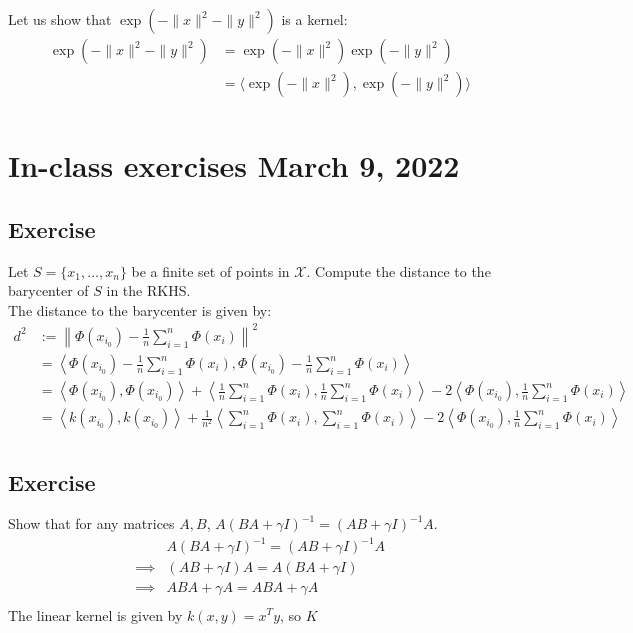 \documentclass{article}
\newcommand{\1}{\mathbf{1}}
\begin{document}
Let us show that \(\exp\left(- \|x\|^2 - \|y\|^2\right)\) is a kernel:
\begin{align*}
  \exp\left(- \|x\|^2 - \|y\|^2\right)
   & = \exp\left(- \|x\|^2 \right) \exp \left(- \|y\|^2\right)                  \\
   & = \langle \exp\left(- \|x\|^2 \right), \exp \left(- \|y\|^2\right) \rangle \\
\end{align*}

\section{In-class exercises March 9, 2022}
\subsection{Exercise}
Let \(S = \{ x_1, \ldots, x_n\}\) be a finite set of points in \(\mathcal{X}\). Compute the distance to the barycenter of \(S\) in the RKHS. \\
The distance to the barycenter is given by:
\begin{align*}
  d^2
   & := \left\| \Phi(x_{i_0}) - \frac{1}{n} \sum_{i=1}^n \Phi(x_i) \right\|^2                                                                                                                                                                       \\
   & = \left\langle \Phi(x_{i_0}) - \frac{1}{n} \sum_{i=1}^n \Phi(x_i), \Phi(x_{i_0}) - \frac{1}{n} \sum_{i=1}^n \Phi(x_i) \right\rangle                                                                                                            \\
   & = \left\langle \Phi(x_{i_0}), \Phi(x_{i_0}) \right\rangle + \left\langle \frac{1}{n} \sum_{i=1}^n \Phi(x_i), \frac{1}{n} \sum_{i=1}^n \Phi(x_i) \right\rangle - 2 \left\langle \Phi(x_{i_0}), \frac{1}{n} \sum_{i=1}^n \Phi(x_i) \right\rangle \\
   & = \left\langle k(x_{i_0}), k(x_{i_0}) \right\rangle + \frac{1}{n^2} \left\langle \sum_{i=1}^n \Phi(x_i), \sum_{i=1}^n \Phi(x_i) \right\rangle - 2 \left\langle \Phi(x_{i_0}), \frac{1}{n} \sum_{i=1}^n \Phi(x_i) \right\rangle                 \\
\end{align*}

\subsection{Exercise}
Show that for any matrices \(A, B\), \(A\left(BA + \gamma I\right)^{-1} = \left(AB + \gamma I\right)^{-1} A\).
\begin{align*}
  &
  A\left(BA + \gamma I\right)^{-1} = \left(AB + \gamma I\right)^{-1} A \\
  \implies &
  \left(AB + \gamma I\right) A = A \left(BA + \gamma I\right) \\
  \implies &
  ABA + \gamma A = ABA + \gamma A \\
\end{align*}
The linear kernel is given by \(k(x, y) = x^T y\), so \(K\)
\end{document}
